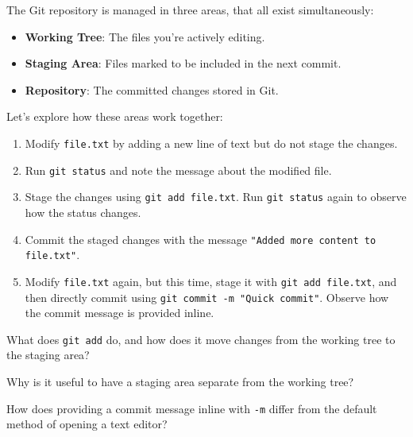 \begin{challenge}
    \begin{task}
        The Git repository is managed in three areas, that all exist simultaneously:
        \begin{itemize}
            \item \textbf{Working Tree}: The files you're actively editing.
            \item \textbf{Staging Area}: Files marked to be included in the next commit.
            \item \textbf{Repository}: The committed changes stored in Git.
        \end{itemize}
        Let's explore how these areas work together:
        \begin{enumerate}
            \item Modify \texttt{file.txt} by adding a new line of text but do not stage the changes.
            \item Run \texttt{git status} and note the message about the modified file.
            \item Stage the changes using \texttt{git add file.txt}. Run \texttt{git status} again to observe how the status changes.
            \item Commit the staged changes with the message \texttt{"Added more content to file.txt"}.
            \item Modify \texttt{file.txt} again, but this time, stage it with \texttt{git add file.txt}, and then directly commit using \texttt{git commit -m "Quick commit"}. Observe how the commit message is provided inline.
        \end{enumerate}

        \begin{questions}
            \item What does \texttt{git add} do, and how does it move changes from the working tree to the staging area?
            \item Why is it useful to have a staging area separate from the working tree?
            \item How does providing a commit message inline with \texttt{-m} differ from the default method of opening a text editor?
        \end{questions}
    \end{task}


\end{challenge}
